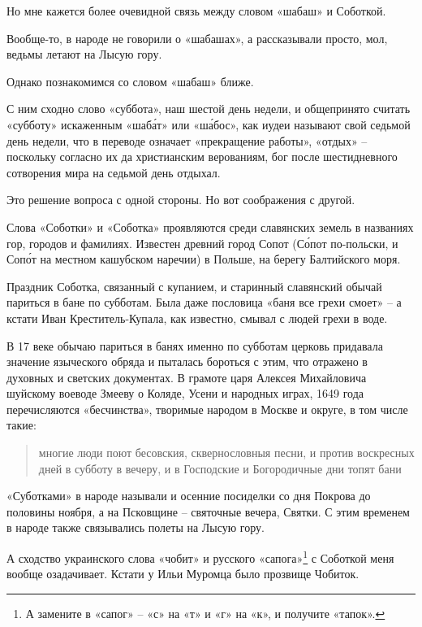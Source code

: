 Но мне кажется более очевидной связь между словом «шабаш» и Соботкой.

Вообще-то, в народе не говорили о «шабашах», а рассказывали просто, мол, ведьмы летают на Лысую гору.

Однако познакомимся со словом «шабаш» ближе. 

С ним сходно слово «суббота», наш шестой день недели, и общепринято считать «субботу» искаженным «шаб\'ат» или «ш\'абос», как иудеи называют свой седьмой день недели, что в переводе означает «прекращение работы», «отдых» – поскольку согласно их да христианским верованиям, бог после шестидневного сотворения мира на седьмой день отдыхал.

Это решение вопроса с одной стороны. Но вот соображения с другой. 

Слова «Соботки» и «Соботка» проявляются среди славянских земель в названиях гор, городов и фамилиях. Известен древний город Сопот (С\'опот по-польски, и Соп\'от на местном кашубском наречии) в Польше, на берегу Балтийского моря.

Праздник Соботка, связанный с купанием, и старинный славянский обычай париться в бане по субботам. Была даже пословица «баня все грехи смоет» – а кстати Иван Креститель-Купала, как известно, смывал с людей грехи в воде. 

В 17 веке обычаю париться в банях именно по субботам церковь придавала значение языческого обряда и пыталась бороться с этим, что отражено в духовных и светских документах. В грамоте царя Алексея Михайловича шуйскому воеводе Змееву о Коляде, Усени и народных играх, 1649 года перечисляются «бесчинства», творимые народом в Москве и округе, в том числе такие:

\begin{quotation}
многие люди поют бесовския, сквернословныя песни, и против воскресных дней в субботу в вечеру, и в Господские и Богородичные дни топят бани
\end{quotation}


«Суботками» в народе называли и осенние посиделки со дня Покрова до половины ноября, а на Псковщине – святочные вечера, Святки. С этим временем в народе также связывались полеты на Лысую гору.

А сходство украинского слова «чобит» и русского «сапога»\footnote{А замените в «сапог» – «с» на «т» и «г» на «к», и получите «тапок».} с Соботкой меня вообще озадачивает. Кстати у Ильи Муромца было прозвище Чобиток.

